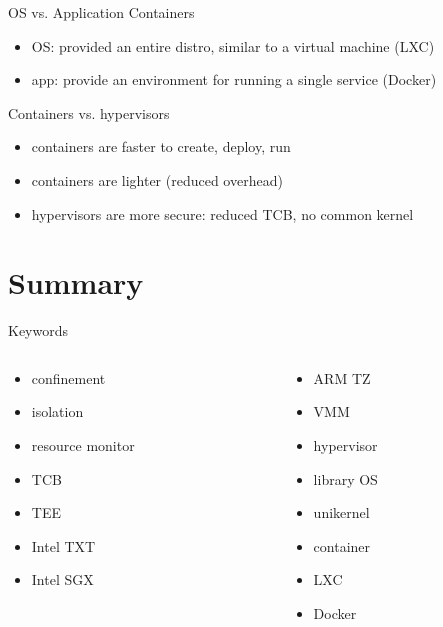 \documentclass{curs}
\begin{document}
\begin{frame}{OS vs. Application Containers}
  \begin{itemize}
    \item OS: provided an entire distro, similar to a virtual machine (LXC)
    \item app: provide an environment for running a single service (Docker)
  \end{itemize}
\end{frame}

\begin{frame}{Containers vs. hypervisors}
  \begin{itemize}
    \item containers are faster to create, deploy, run
    \item containers are lighter (reduced overhead)
    \item hypervisors are more secure: reduced TCB, no common kernel
  \end{itemize}
\end{frame}

\section{Summary}

\begin{frame}{Keywords}
  \begin{columns}
    \begin{column}{0.5\textwidth}
      \begin{itemize}
        \item confinement
        \item isolation
        \item resource monitor
        \item TCB
        \item TEE
        \item Intel TXT
        \item Intel SGX
      \end{itemize}
    \end{column}
    \begin{column}{0.5\textwidth}
      \begin{itemize}
        \item ARM TZ
        \item VMM
        \item hypervisor
        \item library OS
        \item unikernel
        \item container
        \item LXC
        \item Docker
      \end{itemize}
    \end{column}
  \end{columns}
\end{frame}
\end{document}
